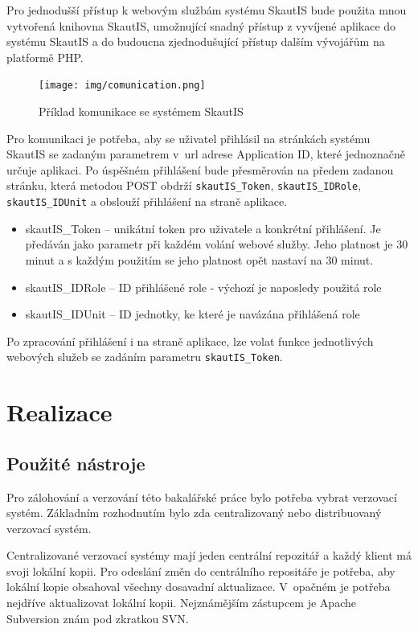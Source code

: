 \documentclass[thesis=B,czech]{FITthesis}[2011/06/14]
\begin{document}
Pro jednodušší přístup k webovým službám systému SkautIS bude použita mnou vytvořená knihovna SkautIS, umožnující snadný přístup z vyvíjené aplikace do systému SkautIS a do budoucna zjednodušující přístup dalším vývojářům na platformě PHP.

\begin{figure}[h] \centering
 	\texttt{[image: img/comunication.png]}
 	\caption[SkautIS]{Příklad komunikace se systémem SkautIS}\label{fig:comunication-diagram}
\end{figure}

Pro komunikaci je potřeba, aby se uživatel přihlásil na stránkách systému SkautIS se zadaným parametrem v~url adrese Application ID, které jednoznačně určuje aplikaci. Po úspěšném přihlášení bude přesměrován na předem zadanou stránku, která metodou POST obdrží \texttt{skautIS\_Token}, \texttt{skautIS\_IDRole}, \texttt{skautIS\_IDUnit} a obslouží přihlášení na straně aplikace.

\begin{itemize}
	\item skautIS\_Token -- unikátní token pro uživatele a konkrétní přihlášení. Je předáván jako parametr při každém volání webové služby. Jeho platnost je 30 minut a s každým použitím se jeho platnost opět nastaví na 30 minut. 
	\item skautIS\_IDRole -- ID přihlášené role - výchozí je naposledy použitá role 
	\item skautIS\_IDUnit -- ID jednotky, ke které je navázána přihlášená role 
\end{itemize}

Po zpracování přihlášení i na straně aplikace, lze volat funkce jednotlivých webových služeb se zadáním parametru \texttt{skautIS\_Token}.

\chapter{Realizace}

\section{Použité nástroje}
Pro zálohování a verzování této bakalářské práce bylo potřeba vybrat verzovací systém. Základním rozhodnutím bylo zda centralizovaný nebo distribuovaný verzovací systém.

Centralizované verzovací systémy mají jeden centrální repozitář a každý klient má svoji lokální kopii. Pro odeslání změn do centrálního repositáře je potřeba, aby lokální kopie obsahoval všechny dosavadní aktualizace. V~opačném je potřeba nejdříve aktualizovat lokální kopii. Nejznámějším zástupcem je Apache Subversion znám pod zkratkou SVN.
\end{document}
